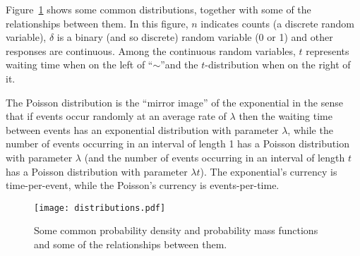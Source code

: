 Figure~\ref{fig:distributions} shows some common distributions, together with some of the relationships between them. In this figure, $n$ indicates counts (a discrete random variable), $\delta$ is a binary (and so discrete) random variable (0 or 1) and other responses are continuous. Among the continuous random variables, $t$ represents waiting time when on the left of ``$\sim$''and the $t$-distribution when on the right of it. 

The Poisson distribution is the ``mirror image'' of the exponential in the sense that if events occur randomly at an average rate of $\lambda$ then the waiting time between events has an exponential distribution with parameter $\lambda$, while the number of events occurring in an interval of length 1 has a Poisson distribution with parameter $\lambda$ (and the number of events occurring in an interval of length $t$ has a Poisson distribution with parameter $\lambda t$). The exponential's currency is time-per-event, while the Poisson's currency is events-per-time.\\

\begin{figure}[ht!]
\caption{\small Some common probability density and probability mass functions and some of the relationships between them.}
\centering
\texttt{[image: distributions.pdf]}
\label{fig:distributions}
\end{figure}


